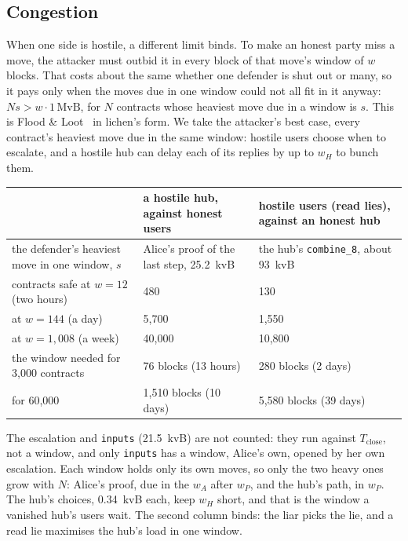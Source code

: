 \documentclass[11pt]{article}
\newcommand{\Tc}{T_{\mathrm{close}}}
\newcommand{\tx}[1]{\texttt{#1}}
\begin{document}
\subsection{Congestion}

When one side is hostile, a different limit binds. To make an honest
party miss a move, the attacker must outbid it in every block of that
move's window of $w$ blocks. That costs about the same whether one
defender is shut out or many, so it pays only when the moves due in one
window could not all fit in it anyway: $N s > w \cdot 1\,\mathrm{MvB}$,
for $N$ contracts whose heaviest move due in a window is $s$. This is
Flood \& Loot~\cite{floodloot} in lichen's form. We take the attacker's
best case, every contract's heaviest move due in the same window:
hostile users choose when to escalate, and a hostile hub can delay each
of its replies by up to $w_H$ to bunch them.

\begin{center}
\small
\begin{tabularx}{\linewidth}{>{\raggedright\arraybackslash}p{52mm}LL}
\toprule
& a hostile hub, against honest users & hostile users (read lies), against an honest hub \\
\midrule
the defender's heaviest move in one window, $s$ & Alice's proof of the last step, 25.2~kvB & the hub's \tx{combine\_8}, about 93~kvB \\
contracts safe at $w = 12$ (two hours) & 480 & 130 \\
at $w = 144$ (a day) & 5,700 & 1,550 \\
at $w = 1{,}008$ (a week) & 40,000 & 10,800 \\
the window needed for 3,000 contracts & 76 blocks (13 hours) & 280 blocks (2 days) \\
for 60,000 & 1,510 blocks (10 days) & 5,580 blocks (39 days) \\
\bottomrule
\end{tabularx}
\end{center}
The escalation and \tx{inputs} (21.5~kvB) are not counted: they run
against $\Tc$, not a window, and only \tx{inputs} has a window, Alice's
own, opened by her own escalation. Each window holds only its own
moves, so only the two heavy ones grow with $N$: Alice's proof, due in
the $w_A$ after $w_P$, and the hub's path, in $w_P$. The hub's choices,
0.34~kvB each, keep $w_H$ short, and that is the window a vanished
hub's users wait. The second column binds: the liar picks the lie, and
a read lie maximises the hub's load in one window.
\end{document}
